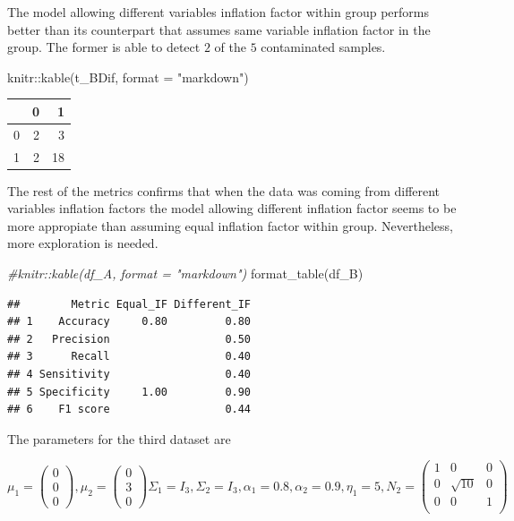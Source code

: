 \documentclass[
]{article}
\newenvironment{Shaded}{\begin{snugshade}}{\end{snugshade}}
\newcommand{\AttributeTok}[1]{\textcolor[rgb]{0.77,0.63,0.00}{#1}}
\newcommand{\CommentTok}[1]{\textcolor[rgb]{0.56,0.35,0.01}{\textit{#1}}}
\newcommand{\FunctionTok}[1]{\textcolor[rgb]{0.00,0.00,0.00}{#1}}
\newcommand{\NormalTok}[1]{#1}
\newcommand{\SpecialCharTok}[1]{\textcolor[rgb]{0.00,0.00,0.00}{#1}}
\newcommand{\StringTok}[1]{\textcolor[rgb]{0.31,0.60,0.02}{#1}}
\begin{document}
The model allowing different variables inflation factor within group
performs better than its counterpart that assumes same variable
inflation factor in the group. The former is able to detect \(2\) of the
\(5\) contaminated samples.

\begin{Shaded}
\begin{Highlighting}[]
\NormalTok{knitr}\SpecialCharTok{::}\FunctionTok{kable}\NormalTok{(t\_BDif, }\AttributeTok{format =} \StringTok{"markdown"}\NormalTok{)}
\end{Highlighting}
\end{Shaded}

\begin{longtable}[]{@{}lrr@{}}
\toprule()
& 0 & 1 \\
\midrule()
\endhead
0 & 2 & 3 \\
1 & 2 & 18 \\
\bottomrule()
\end{longtable}

The rest of the metrics confirms that when the data was coming from
different variables inflation factors the model allowing different
inflation factor seems to be more appropiate than assuming equal
inflation factor within group. Nevertheless, more exploration is needed.

\begin{Shaded}
\begin{Highlighting}[]
\CommentTok{\#knitr::kable(df\_A, format = "markdown")}
\FunctionTok{format\_table}\NormalTok{(df\_B)}
\end{Highlighting}
\end{Shaded}

\begin{verbatim}
##        Metric Equal_IF Different_IF
## 1    Accuracy     0.80         0.80
## 2   Precision                  0.50
## 3      Recall                  0.40
## 4 Sensitivity                  0.40
## 5 Specificity     1.00         0.90
## 6    F1 score                  0.44
\end{verbatim}

The parameters for the third dataset are

\[
\mu_{1} = \begin{pmatrix} 0 \\ 0 \\  0 \end{pmatrix} ,  \mu_{2} = \begin{pmatrix} 0 \\ 3 \\ 0 \end{pmatrix}  \Sigma_{1} = I_{3}, \Sigma_{2} = I_{3}, \alpha_{1} = 0.8, \alpha_{2} = 0.9, \eta_{1} = 5,N_{2} = \begin{pmatrix} 1 & 0 & 0  \\ 0 & \sqrt{10} & 0  \\ 0 & 0 & 1  \\\end{pmatrix}
\]
\end{document}
